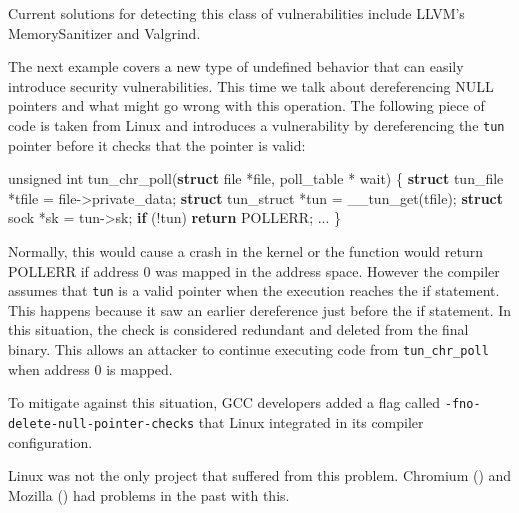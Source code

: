\documentclass[
  a4paper,
]{report}
\newenvironment{Shaded}{}{}
\newcommand{\ControlFlowTok}[1]{\textcolor[rgb]{0.00,0.44,0.13}{\textbf{#1}}}
\newcommand{\DataTypeTok}[1]{\textcolor[rgb]{0.56,0.13,0.00}{#1}}
\newcommand{\KeywordTok}[1]{\textcolor[rgb]{0.00,0.44,0.13}{\textbf{#1}}}
\newcommand{\NormalTok}[1]{#1}
\newcommand{\OperatorTok}[1]{\textcolor[rgb]{0.40,0.40,0.40}{#1}}
\begin{document}
Current solutions for detecting this class of vulnerabilities include
LLVM's MemorySanitizer and Valgrind.

The next example covers a new type of undefined behavior that can easily
introduce security vulnerabilities. This time we talk about
dereferencing NULL pointers and what might go wrong with this operation.
The following piece of code is taken from Linux and introduces a
vulnerability by dereferencing the \texttt{tun} pointer before it checks
that the pointer is valid:

\begin{Shaded}
\begin{Highlighting}[]
\DataTypeTok{unsigned} \DataTypeTok{int}
\NormalTok{tun\_chr\_poll}\OperatorTok{(}\KeywordTok{struct}\NormalTok{ file }\OperatorTok{*}\NormalTok{file}\OperatorTok{,}\NormalTok{ poll\_table }\OperatorTok{*}\NormalTok{ wait}\OperatorTok{)}
\OperatorTok{\{}
  \KeywordTok{struct}\NormalTok{ tun\_file }\OperatorTok{*}\NormalTok{tfile }\OperatorTok{=}\NormalTok{ file}\OperatorTok{{-}\textgreater{}}\NormalTok{private\_data}\OperatorTok{;}
  \KeywordTok{struct}\NormalTok{ tun\_struct }\OperatorTok{*}\NormalTok{tun }\OperatorTok{=}\NormalTok{ \_\_tun\_get}\OperatorTok{(}\NormalTok{tfile}\OperatorTok{);}
  \KeywordTok{struct}\NormalTok{ sock }\OperatorTok{*}\NormalTok{sk }\OperatorTok{=}\NormalTok{ tun}\OperatorTok{{-}\textgreater{}}\NormalTok{sk}\OperatorTok{;}
  \ControlFlowTok{if} \OperatorTok{(!}\NormalTok{tun}\OperatorTok{)}
    \ControlFlowTok{return}\NormalTok{ POLLERR}\OperatorTok{;}
  \OperatorTok{...}
\OperatorTok{\}}
\end{Highlighting}
\end{Shaded}

Normally, this would cause a crash in the kernel or the function would
return POLLERR if address 0 was mapped in the address space. However the
compiler assumes that \texttt{tun} is a valid pointer when the execution
reaches the if statement. This happens because it saw an earlier
dereference just before the if statement. In this situation, the check
is considered redundant and deleted from the final binary. This allows
an attacker to continue executing code from \texttt{tun\_chr\_poll} when
address 0 is mapped.

To mitigate against this situation, GCC developers added a flag called
\texttt{-fno-delete-null-pointer-checks} that Linux integrated in its
compiler configuration.

Linux was not the only project that suffered from this problem. Chromium
() and Mozilla () had
problems in the past with this.
\end{document}
